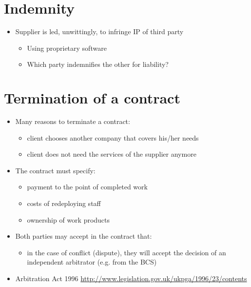 \documentclass{article}
\begin{document}
\section{Indemnity}
\begin{itemize}
\item Supplier is led, unwittingly, to infringe IP of third party 
\begin{itemize}
\item Using proprietary software
\item Which party indemnifies the other for liability?
\end{itemize}
\end{itemize}



\section{Termination of a contract}
\begin{itemize}
\item Many reasons to terminate a contract:
\begin{itemize}
\item client chooses another company that covers his/her needs
\item client does not need the services of the supplier anymore
\end{itemize}
\item The contract must specify:
\begin{itemize}
\item payment to the point of completed work
\item costs of redeploying staff
\item ownership of work products
\end{itemize}
\item Both parties may accept in the contract that:
\begin{itemize}
\item in the case of conflict (dispute), they will accept the decision of an independent arbitrator (e.g. from the BCS)
\end{itemize}
\item Arbitration Act 1996 \url{http://www.legislation.gov.uk/ukpga/1996/23/contents}
\end{itemize}
\end{document}
